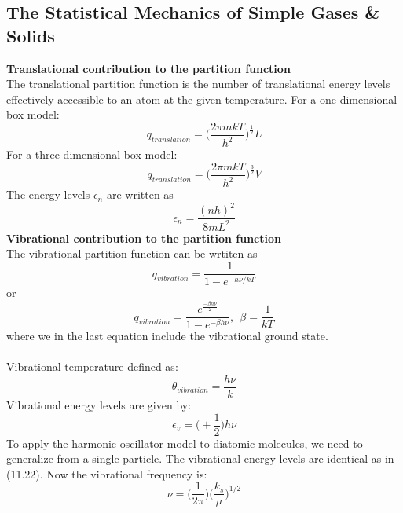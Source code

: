\documentclass[8pt]{article}
\numberwithin{equation}{section}
\begin{document}
\begin{multicols}{2}
\section{The Statistical Mechanics of Simple Gases \& Solids}
\textbf{Translational contribution to the partition function} \\ 
The translational partition function is the number of translational energy levels effectively accessible to an atom at the given temperature. 
For a one-dimensional box model:
\begin{equation}
q_{translation}=\bigg(\frac{2\pi mkT}{h^{2}}\bigg)^{\frac{1}{2}}L \tag{11.15}
\end{equation}
For a three-dimensional box model:
\begin{equation}
q_{translation}=\bigg(\frac{2\pi mkT}{h^{2}}\bigg)^{\frac{3}{2}}V \tag{11.18}
\end{equation}
The energy levels $\epsilon_{n}$ are written as 
\begin{equation}
\epsilon_{n}=\frac{(nh)^{2}}{8mL^{2}} \tag{11.12}
\end{equation}
\textbf{Vibrational contribution to the partition function} \\ 
The vibrational partition function can be wrtiten as
\begin{equation}
q_{vibration}=\frac{1}{1-e^{-h\nu/kT}} \tag{11.26}
\end{equation}
or 
\begin{equation}
q_{vibration}=\frac{e^{\frac{-\beta h\nu}{2}}}{1-e^{-\beta h\nu}}, \ \ \beta = \frac{1}{kT} \tag{11.26}
\end{equation}
where we in the last equation include the vibrational ground state. \\ \\
Vibrational temperature defined as: 
\begin{equation}
\theta_{vibration}=\frac{h\nu}{k} \tag{-}
\end{equation}
Vibrational energy levels are given by: 
\begin{equation}
\epsilon_{v}=\bigg(+\frac{1}{2}\bigg)h\nu \tag{11.22}
\end{equation}
To apply the harmonic oscillator model to diatomic molecules, we need to generalize from a single particle. The vibrational energy levels are identical as in (11.22). Now the vibrational frequency is: 
\begin{equation}
\nu=\bigg(\frac{1}{2\pi} \bigg)\bigg(\frac{k_{s}}{\mu}\bigg)^{1/2} \tag{11.23}
\end{equation}

\end{multicols}
\end{document}
